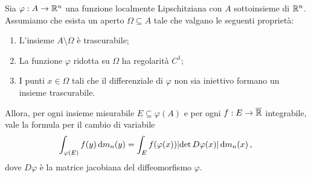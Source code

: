 \begin{corollary}\label{cor:CambioVariabileSporco}
	Sia $\varphi:A\to\mathbb R^n$ una funzione localmente Lipschitziana con $A$ sottoinsieme di $\mathbb R^n$.
	Assumiamo che esista un aperto $\Omega\subseteq A$ tale che valgano le seguenti proprietà:
	\begin{enumerate}
		\item L'insieme $A\setminus \Omega$ è trascurabile;
		\item La funzione $\varphi$ ridotta su $\Omega$ ha regolarità $C^1$;
		\item I punti $x\in\Omega$ tali che il differenziale di $\varphi$ non sia iniettivo formano un insieme trascurabile.
	\end{enumerate}
	
	Allora, per ogni insieme misurabile $E\subseteq \varphi(A)$ e per ogni $f:E\to\overline{\mathbb R}$ integrabile, vale la formula per il cambio di variabile
	\begin{equation*}
		\int_{\varphi(E)} f(y)\,\mathrm d m_n(y) = \int_{E} f(\varphi(x))\lvert \det D\varphi(x) \rvert \,\mathrm d m_n(x) \, \text{, }
	\end{equation*}
	dove $D\varphi$ è la matrice jacobiana del diffeomorfismo $\varphi$.
\end{corollary}
